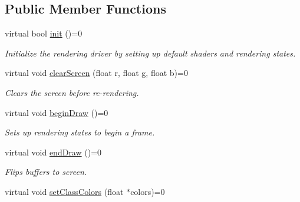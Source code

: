\subsection*{Public Member Functions}
\begin{DoxyCompactItemize}
\item 
virtual bool \hyperlink{class_lots_of_lines_1_1_i_renderer_adc6015bfdf756f4adc59805482b71715}{init} ()=0\hypertarget{class_lots_of_lines_1_1_i_renderer_adc6015bfdf756f4adc59805482b71715}{}\label{class_lots_of_lines_1_1_i_renderer_adc6015bfdf756f4adc59805482b71715}

\begin{DoxyCompactList}\small\item\em Initialize the rendering driver by setting up default shaders and rendering states. \end{DoxyCompactList}\item 
virtual void \hyperlink{class_lots_of_lines_1_1_i_renderer_a076759fc7971de5b7deed588f1d104be}{clear\+Screen} (float r, float g, float b)=0\hypertarget{class_lots_of_lines_1_1_i_renderer_a076759fc7971de5b7deed588f1d104be}{}\label{class_lots_of_lines_1_1_i_renderer_a076759fc7971de5b7deed588f1d104be}

\begin{DoxyCompactList}\small\item\em Clears the screen before re-\/rendering. \end{DoxyCompactList}\item 
virtual void \hyperlink{class_lots_of_lines_1_1_i_renderer_a87dd1fd9695ec5722e4201527075aa51}{begin\+Draw} ()=0\hypertarget{class_lots_of_lines_1_1_i_renderer_a87dd1fd9695ec5722e4201527075aa51}{}\label{class_lots_of_lines_1_1_i_renderer_a87dd1fd9695ec5722e4201527075aa51}

\begin{DoxyCompactList}\small\item\em Sets up rendering states to begin a frame. \end{DoxyCompactList}\item 
virtual void \hyperlink{class_lots_of_lines_1_1_i_renderer_a3f06c10327391ac4f8ad9931409cdda8}{end\+Draw} ()=0\hypertarget{class_lots_of_lines_1_1_i_renderer_a3f06c10327391ac4f8ad9931409cdda8}{}\label{class_lots_of_lines_1_1_i_renderer_a3f06c10327391ac4f8ad9931409cdda8}

\begin{DoxyCompactList}\small\item\em Flips buffers to screen. \end{DoxyCompactList}\item 
virtual void \hyperlink{class_lots_of_lines_1_1_i_renderer_aabdce3cb566a653d8b47a9c6ba13a8f0}{set\+Class\+Colors} (float $\ast$colors)=0\hypertarget{class_lots_of_lines_1_1_i_renderer_aabdce3cb566a653d8b47a9c6ba13a8f0}{}\label{class_lots_of_lines_1_1_i_renderer_aabdce3cb566a653d8b47a9c6ba13a8f0}


\end{DoxyCompactItemize}
